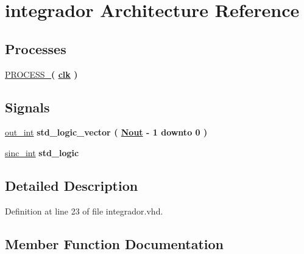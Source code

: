 \hypertarget{classintegrador_1_1integrador}{}\section{integrador Architecture Reference}
\label{classintegrador_1_1integrador}
\subsection*{Processes}
 \begin{DoxyCompactItemize}
\item 
\hyperlink{classintegrador_1_1integrador_afcc525892643d4614179ad348921cd15}{P\+R\+O\+C\+E\+S\+S\+\_}{\bfseries  ( {\bfseries {\bfseries \hyperlink{classintegrador_a4a4609c199d30b3adebbeb3a01276ec5}{clk}} \textcolor{vhdlchar}{ }} )}
\end{DoxyCompactItemize}
\subsection*{Signals}
 \begin{DoxyCompactItemize}
\item 
\hyperlink{classintegrador_1_1integrador_a951e616187c21eeebaa382a516df536e}{out\+\_\+int} {\bfseries \textcolor{comment}{std\+\_\+logic\+\_\+vector}\textcolor{vhdlchar}{ }\textcolor{vhdlchar}{(}\textcolor{vhdlchar}{ }\textcolor{vhdlchar}{ }\textcolor{vhdlchar}{ }\textcolor{vhdlchar}{ }{\bfseries \hyperlink{classintegrador_a061c0d632c8bdf5dd32c80acf9a9c475}{Nout}} \textcolor{vhdlchar}{-\/}\textcolor{vhdlchar}{ } \textcolor{vhdldigit}{1} \textcolor{vhdlchar}{ }\textcolor{keywordflow}{downto}\textcolor{vhdlchar}{ }\textcolor{vhdlchar}{ } \textcolor{vhdldigit}{0} \textcolor{vhdlchar}{ }\textcolor{vhdlchar}{)}\textcolor{vhdlchar}{ }} 
\item 
\hyperlink{classintegrador_1_1integrador_a45126d1a75be347f440d181b7aa5e033}{sinc\+\_\+int} {\bfseries \textcolor{comment}{std\+\_\+logic}\textcolor{vhdlchar}{ }} 
\end{DoxyCompactItemize}


\subsection{Detailed Description}


Definition at line 23 of file integrador.\+vhd.



\subsection{Member Function Documentation}
\hypertarget{classintegrador_1_1integrador_afcc525892643d4614179ad348921cd15}{}
